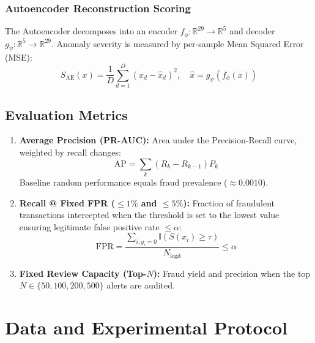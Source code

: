 \documentclass[conference]{IEEEtran}
\begin{document}
\subsubsection{Autoencoder Reconstruction Scoring}
The Autoencoder decomposes into an encoder $f_{\phi}: \mathbb{R}^{29} \to \mathbb{R}^5$ and decoder $g_{\psi}: \mathbb{R}^5 \to \mathbb{R}^{29}$. Anomaly severity is measured by per-sample Mean Squared Error (MSE):
\begin{equation}
S_{\text{AE}}(x) = \frac{1}{D} \sum_{d=1}^D (x_d - \hat{x}_d)^2, \quad \hat{x} = g_{\psi}(f_{\phi}(x))
\end{equation}

\subsection{Evaluation Metrics}
\begin{enumerate}
    \item \textbf{Average Precision (PR-AUC):} Area under the Precision-Recall curve, weighted by recall changes:
    \begin{equation}
    \text{AP} = \sum_k (R_k - R_{k-1}) P_k
    \end{equation}
    Baseline random performance equals fraud prevalence ($\approx 0.0010$).
    \item \textbf{Recall @ Fixed FPR ($\le 1\%$ and $\le 5\%$):} Fraction of fraudulent transactions intercepted when the threshold is set to the lowest value ensuring legitimate false positive rate $\le \alpha$:
    \begin{equation}
    \text{FPR} = \frac{\sum_{i: y_i=0} \mathbb{I}(S(x_i) \ge \tau)}{N_{\text{legit}}} \le \alpha
    \end{equation}
    \item \textbf{Fixed Review Capacity (Top-$N$):} Fraud yield and precision when the top $N \in \{50, 100, 200, 500\}$ alerts are audited.
\end{enumerate}

\section{Data and Experimental Protocol}
\end{document}
